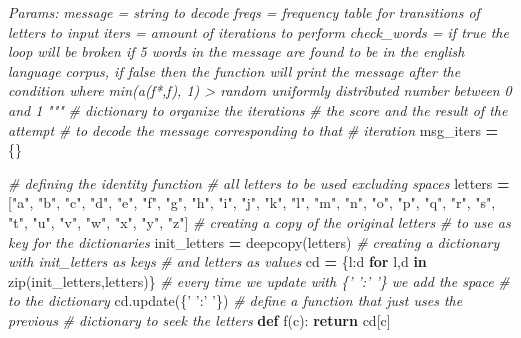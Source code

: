 \documentclass[]{article}
\newenvironment{Shaded}{\begin{snugshade}}{\end{snugshade}}
\newcommand{\BuiltInTok}[1]{#1}
\newcommand{\CommentTok}[1]{\textcolor[rgb]{0.56,0.35,0.01}{\textit{#1}}}
\newcommand{\ControlFlowTok}[1]{\textcolor[rgb]{0.13,0.29,0.53}{\textbf{#1}}}
\newcommand{\KeywordTok}[1]{\textcolor[rgb]{0.13,0.29,0.53}{\textbf{#1}}}
\newcommand{\NormalTok}[1]{#1}
\newcommand{\OperatorTok}[1]{\textcolor[rgb]{0.81,0.36,0.00}{\textbf{#1}}}
\newcommand{\StringTok}[1]{\textcolor[rgb]{0.31,0.60,0.02}{#1}}
\begin{document}
\begin{Shaded}
\begin{Highlighting}[]
\CommentTok{    Params:}
\CommentTok{    message =     string to decode}
\CommentTok{    freqs =       frequency table for transitions of letters}
\CommentTok{                  to input}
\CommentTok{    iters =       amount of iterations to perform}
\CommentTok{    check_words = if true the loop will be broken if 5 words}
\CommentTok{                  in the message are found to be in the english}
\CommentTok{                  language corpus, if false then the function will}
\CommentTok{                  print the message after the condition where}
\CommentTok{                  min(a(f*,f), 1) > random uniformly distributed number between}
\CommentTok{                  0 and 1}
\CommentTok{    """}
    \CommentTok{# dictionary to organize the iterations}
    \CommentTok{# the score and the result of the attempt}
    \CommentTok{# to decode the message corresponding to that}
    \CommentTok{# iteration}
\NormalTok{    msg_iters }\OperatorTok{=}\NormalTok{ \{\}}

    \CommentTok{# defining the identity function}
    \CommentTok{# all letters to be used excluding spaces}
\NormalTok{    letters }\OperatorTok{=}\NormalTok{ [}\StringTok{"a"}\NormalTok{, }\StringTok{"b"}\NormalTok{, }\StringTok{"c"}\NormalTok{, }\StringTok{"d"}\NormalTok{,}
                \StringTok{"e"}\NormalTok{, }\StringTok{"f"}\NormalTok{, }\StringTok{"g"}\NormalTok{, }\StringTok{"h"}\NormalTok{, }
                \StringTok{"i"}\NormalTok{, }\StringTok{"j"}\NormalTok{, }\StringTok{"k"}\NormalTok{, }\StringTok{"l"}\NormalTok{, }
                \StringTok{"m"}\NormalTok{, }\StringTok{"n"}\NormalTok{, }\StringTok{"o"}\NormalTok{, }\StringTok{"p"}\NormalTok{, }
                \StringTok{"q"}\NormalTok{, }\StringTok{"r"}\NormalTok{, }\StringTok{"s"}\NormalTok{, }\StringTok{"t"}\NormalTok{, }
                \StringTok{"u"}\NormalTok{, }\StringTok{"v"}\NormalTok{, }\StringTok{"w"}\NormalTok{, }\StringTok{"x"}\NormalTok{, }
                \StringTok{"y"}\NormalTok{, }\StringTok{"z"}\NormalTok{]}
    \CommentTok{# creating a copy of the original letters}
    \CommentTok{# to use as key for the dictionaries}
\NormalTok{    init_letters }\OperatorTok{=}\NormalTok{ deepcopy(letters)}
    \CommentTok{# creating a dictionary with init_letters as keys}
    \CommentTok{# and letters as values}
\NormalTok{    cd }\OperatorTok{=}\NormalTok{ \{l:d }\ControlFlowTok{for}\NormalTok{ l,d }\KeywordTok{in} \BuiltInTok{zip}\NormalTok{(init_letters,letters)\}}
    \CommentTok{# every time we update with \{' ':' '\} we add the space}
    \CommentTok{# to the dictionary}
\NormalTok{    cd.update(\{}\StringTok{' '}\NormalTok{:}\StringTok{' '}\NormalTok{\})}
    \CommentTok{# define a function that just uses the previous}
    \CommentTok{# dictionary to seek the letters}
    \KeywordTok{def}\NormalTok{ f(c):}
        \ControlFlowTok{return}\NormalTok{ cd[c]}
    

\end{Highlighting}
\end{Shaded}
\end{document}
